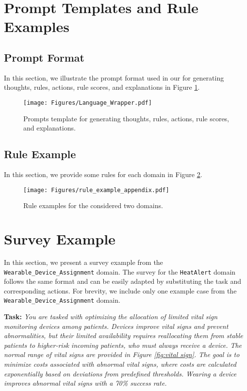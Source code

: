 \section{Prompt Templates and Rule Examples}\label{sec:prompt_appendix}

\subsection{Prompt Format}
In this section, we illustrate the prompt format used in our \rbrl for generating thoughts, rules, actions, rule scores, and explanations in Figure \ref{fig:combined_prompt}.






\begin{figure}[H]
    \centering    \texttt{[image: Figures/Language\_Wrapper.pdf]}
    \caption{Prompts template for generating thoughts, rules, actions, rule scores, and explanations. }
    \label{fig:combined_prompt}
\end{figure}
 













\subsection{Rule Example}
In this section, we provide some rules for each domain in Figure \ref{fig:rule_example}.
\begin{figure}[H]
    \centering
    \texttt{[image: Figures/rule\_example\_appendix.pdf]}
    \caption{Rule examples for the considered two domains.}
    \label{fig:rule_example}
\end{figure}

\section{Survey Example}
\label{appdx:survey}
In this section, we present a survey example from the \texttt{Wearable\_Device\_Assignment} domain. The survey for the \texttt{HeatAlert} domain follows the same format and can be easily adapted by substituting the task and corresponding actions. For brevity, we include only one example case from the \texttt{Wearable\_Device\_Assignment}  domain.


\textbf{Task:} \emph{You are tasked with optimizing the allocation of limited vital sign monitoring devices among patients. Devices improve vital signs and prevent abnormalities, but their limited availability requires reallocating them from stable patients to higher-risk incoming patients, who must always receive a device. The normal range of vital signs are provided in Figure \ref{fig:vital sign}. The goal is to minimize costs associated with abnormal vital signs, where costs are calculated exponentially based on deviations from predefined thresholds. Wearing a device improves abnormal vital signs with a 70\% success rate.}


